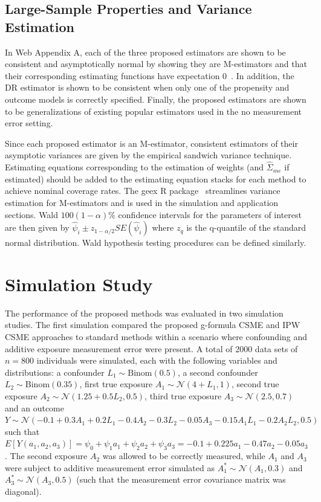 \documentclass[useAMS,usenatbib,referee]{biom}
\begin{document}
\subsection{Large-Sample Properties and Variance Estimation}

In Web Appendix A, each of the three proposed estimators are shown to be consistent and asymptotically normal by showing they are M-estimators and that their corresponding estimating functions have expectation 0~\citep{stefanski2002}. In addition, the DR estimator is shown to be consistent when only one of the propensity and outcome models is correctly specified. Finally, the proposed estimators are shown to be generalizations of existing popular estimators used in the no measurement error setting.

Since each proposed estimator is an M-estimator, consistent estimators of their asymptotic variances are given by the empirical sandwich variance technique. Estimating equations corresponding to the estimation of weights (and $\hat{\Sigma}_{me}$ if estimated) should be added to the estimating equation stacks for each method to achieve nominal coverage rates. The geex R package~\citep{saul2017} streamlines variance estimation for M-estimators and is used in the simulation and application sections. Wald $100(1-\alpha)\%$ confidence intervals for the parameters of interest are then given by $\hat{\psi}_{i} \pm z_{1-\alpha/2} SE(\hat{\psi}_{i})$ where $z_q$ is the q-quantile of the standard normal distribution. Wald hypothesis testing procedures can be defined similarly.

\section{Simulation Study}

The performance of the proposed methods was evaluated in two simulation studies. The first simulation compared the proposed g-formula CSME and IPW CSME approaches to standard methods within a scenario where confounding and additive exposure measurement error were present. A total of 2000 data sets of $n = 800$ individuals were simulated, each with the following variables and distributions: a confounder $L_{1} \sim \text{Binom}(0.5)$, a second confounder $L_{2} \sim \text{Binom}(0.35)$, first true exposure $A_{1} \sim \mathcal{N}(4 + L_{1}, 1)$, second true exposure $A_{2} \sim \mathcal{N}(1.25 + 0.5L_{2}, 0.5)$, third true exposure $A_{3} \sim \mathcal{N}(2.5, 0.7)$ and an outcome $Y \sim \mathcal{N}(-0.1 + 0.3A_{1} + 0.2L_{1} - 0.4A_{2} - 0.3L_{2} - 0.05A_{3} - 0.15A_{1}L_{1} - 0.2A_{2}L_{2}, 0.5)$ such that $E[Y(a_{1}, a_{2}, a_{3})] = \psi_{0} + \psi_{1}a_{1} + \psi_{2}a_{2} + \psi_{3}a_{3} = -0.1 + 0.225a_{1} - 0.47a_{2} - 0.05a_{3}$. The second exposure $A_{2}$ was allowed to be correctly measured, while $A_{1}$ and $A_{3}$ were subject to additive measurement error simulated as $A_{1}^{*} \sim \mathcal{N}(A_{1}, 0.3)$ and $A_{3}^{*} \sim \mathcal{N}(A_{3}, 0.5)$ (such that the measurement error covariance matrix was diagonal).
\end{document}
